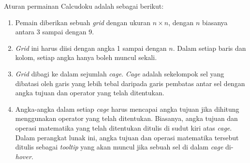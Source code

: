 \documentclass[11pt,a4paper,twoside,openright]{article}
\begin{document}
Aturan permainan Calcudoku adalah sebagai berikut:
\begin{enumerate}
\item Pemain diberikan sebuah \textit{grid} dengan ukuran \begin{math}n \times n\end{math}, dengan \begin{math}n\end{math} biasanya antara 3 sampai dengan 9.
\item \textit{Grid} ini harus diisi dengan angka 1 sampai dengan \begin{math}n\end{math}. Dalam setiap baris dan kolom, setiap angka hanya boleh muncul sekali.
\item \textit{Grid} dibagi ke dalam sejumlah \textit{cage}. \textit{Cage} adalah sekelompok sel yang dibatasi oleh garis yang lebih tebal daripada garis pembatas antar sel dengan angka tujuan dan operator yang telah ditentukan.
\item Angka-angka dalam setiap \textit{cage} harus mencapai angka tujuan jika dihitung menggunakan operator yang telah ditentukan. Biasanya, angka tujuan dan operasi matematika yang telah ditentukan ditulis di sudut kiri atas \textit{cage}. Dalam perangkat lunak ini, angka tujuan dan operasi matematika tersebut ditulis sebagai \textit{tooltip} yang akan muncul jika sebuah sel di dalam \textit{cage} di-\textit{hover}.
\end{enumerate}
\end{document}
